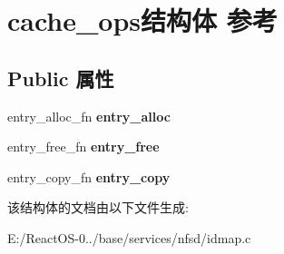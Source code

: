 \hypertarget{structcache__ops}{}\section{cache\+\_\+ops结构体 参考}
\label{structcache__ops}
\subsection*{Public 属性}
\begin{DoxyCompactItemize}
\item 
\mbox{\label{structcache__ops_a35d85457f3401f3600c423be814c63ed}} 
entry\+\_\+alloc\+\_\+fn {\bfseries entry\+\_\+alloc}
\item 
\mbox{\label{structcache__ops_aebb3ea8760bb877082c18a7f9e3d8c06}} 
entry\+\_\+free\+\_\+fn {\bfseries entry\+\_\+free}
\item 
\mbox{\label{structcache__ops_af5b95933fce5525ce3f51a3372ebaab0}} 
entry\+\_\+copy\+\_\+fn {\bfseries entry\+\_\+copy}
\end{DoxyCompactItemize}


该结构体的文档由以下文件生成\+:\begin{DoxyCompactItemize}
\item 
E\+:/\+React\+O\+S-\/0../base/services/nfsd/idmap.\+c\end{DoxyCompactItemize}

